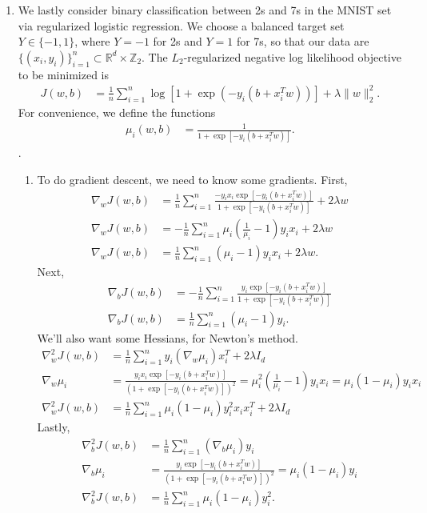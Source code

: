 \documentclass[11pt,letterpaper]{article}
\numberwithin{equation}{section}
\numberwithin{figure}{section}
\begin{document}
\begin{enumerate}
	\item We lastly consider binary classification between 2s and 7s in the MNIST set via regularized logistic regression. We choose a balanced target set $Y \in \{-1,1\}$, where $Y=-1$ for 2s and $Y = 1$ for 7s, so that our data are $\{(x_i,y_i)\}_{i=1}^n \subset \mathbb{R}^d \times \mathbb{Z}_2$. The $L_2$-regularized negative log likelihood objective to be minimized is
	\begin{align*}
		J(w,b) &= \frac{1}{n} \sum_{i=1}^n \log\left[1 + \exp\left(-y_i(b+x_i^T w)\right)\right] + \lambda \|w\|_2^2.
	\end{align*}
	For convenience, we define the functions
	\begin{align*}
		\mu_i(w,b) &= \frac{1}{1+\exp\left[-y_i(b+x_i^T w)\right]}.
	\end{align*}.
	\begin{enumerate}
		\item To do gradient descent, we need to know some gradients. First,
		\begin{align*}
			\nabla_w J(w,b) &= \frac{1}{n} \sum_{i=1}^n \frac{-y_i x_i \exp\left[-y_i(b + x_i^T w)\right]}{1 + \exp\left[-y_i(b+x_i^T w)\right]} + 2\lambda w\\
			\nabla_w J(w,b) &= -\frac{1}{n} \sum_{i=1}^n \mu_i \left(\frac{1}{\mu_i} - 1\right) y_i x_i + 2\lambda w\\
			\nabla_w J(w,b) &= \frac{1}{n} \sum_{i=1}^n (\mu_i - 1) y_i x_i + 2\lambda w.
		\end{align*}
		Next,
		\begin{align*}
			\nabla_b J(w,b) &= -\frac{1}{n} \sum_{i=1}^n \frac{y_i \exp\left[-y_i(b + x_i^T w)\right]}{1+\exp\left[-y_i(b+x_i^T w)\right]}\\
			\nabla_b J(w,b) &= \frac{1}{n} \sum_{i=1}^n (\mu_i -1) y_i.
		\end{align*}
		We'll also want some Hessians, for Newton's method.
		\begin{align*}
			\nabla^2_w J(w,b) &= \frac{1}{n} \sum_{i=1}^n y_i (\nabla_w \mu_i) x_i^T + 2\lambda I_d\\
			\nabla_w \mu_i &= \frac{y_i x_i \exp\left[-y_i(b+x_i^T w)\right]}{\left(1+\exp\left[-y_i(b+x_i^T w)\right]\right)^2} = \mu_i^2 \left(\frac{1}{\mu_i} - 1\right) y_i x_i = \mu_i (1- \mu_i) y_i x_i\\
			\nabla^2_w J(w,b) &= \frac{1}{n} \sum_{i=1}^n \mu_i (1-\mu_i) y_i^2 x_i x_i^T + 2 \lambda I_d
		\end{align*}
		Lastly,
		\begin{align*}
			\nabla^2_b J(w,b) &= \frac{1}{n} \sum_{i=1}^n (\nabla_b \mu_i) y_i\\
			\nabla_b \mu_i &= \frac{y_i \exp\left[-y_i(b+x_i^T w)\right]}{\left(1+\exp\left[-y_i(b+x_i^T w)\right]\right)^2} = \mu_i(1-\mu_i)y_i\\
			\nabla^2_b J(w,b) &= \frac{1}{n} \sum_{i=1}^n \mu_i(1-\mu_i) y_i^2.
		\end{align*}
	\end{enumerate}
\end{enumerate}
\end{document}
